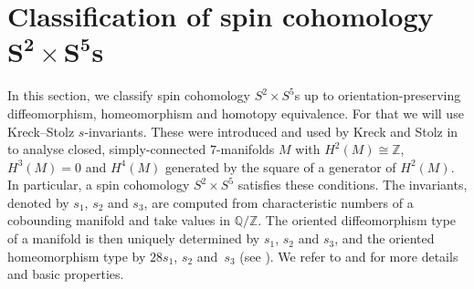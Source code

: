\documentclass[10pt,a4paper]{amsart}
\numberwithin{equation}{section}
\theoremstyle{definition}
\numberwithin{table}{section}
\newcommand{\Z}{\mathbb{Z}}
\newcommand{\Q}{\mathbb{Q}}
\begin{document}
\section[Classification of spin cohomology S\^{}2 times S\^{}5s]{Classification of spin cohomology $\boldsymbol{S^2\times S^5}$s}\label{S:class}

In this section, we classify spin cohomology $S^2\times S^5$s up to orientation-preserving diffeomorphism, homeomorphism and homotopy equivalence. For that we will use Kreck--Stolz $s$-invariants. These were introduced and used by Kreck and Stolz in \cite{KS88,KS91,KS98} to analyse closed, simply-connected $7$-manifolds $M$ with $H^2(M)\cong \Z$, $H^3(M)=0$ and $H^4(M)$ generated by the square of a generator of $H^2(M)$. In particular, a spin cohomology $S^2\times S^5$ satisfies these conditions. The invariants, denoted by $s_1$, $s_2$ and $s_3$, are computed from characteristic numbers of a cobounding manifold and take values in $\Q/\Z$. The oriented diffeomorphism type of a manifold is then uniquely determined by $s_1$, $s_2$ and $s_3$, and the oriented homeomorphism type by $28s_1$, $s_2$ and~$s_3$ (see \cite[Section 3]{KS88}). We refer to \cite{KS88,KS91,KS98} and \cite[Section 2.2]{Xu25} for more details and basic properties.
\end{document}
